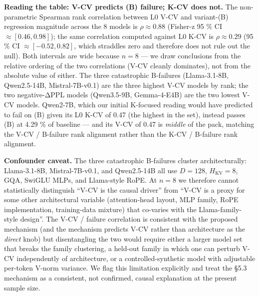 \textbf{Reading the table: V-CV predicts (B) failure; K-CV does not.}
The non-parametric Spearman rank correlation between L0 V-CV and
variant-(B) regression magnitude across the 8 models is
\(\rho \approx 0.88\) (Fisher-z 95 \% CI \(\approx [0.46, 0.98]\)); the
same correlation computed against L0 K-CV is \(\rho \approx 0.29\) (95
\% CI \(\approx [-0.52, 0.82]\), which straddles zero and therefore does
not rule out the null). Both intervals are wide because \(n = 8\) --- we
draw conclusions from the relative ordering of the two correlations
(V-CV cleanly dominates), not from the absolute value of either. The
three catastrophic B-failures (Llama-3.1-8B, Qwen2.5-14B,
Mistral-7B-v0.1) are the three highest V-CV models by rank; the two
negative-ΔPPL models (Qwen3.5-9B, Gemma-4-E4B) are the two lowest V-CV
models. Qwen2-7B, which our initial K-focused reading would have
predicted to fail on (B) given its L0 K-CV of 0.47 (the highest in the
set), instead passes (B) at 4.29 \% of baseline --- and its V-CV of 0.47
is \emph{middle} of the pack, matching the V-CV / B-failure rank
alignment rather than the K-CV / B-failure rank alignment.

\textbf{Confounder caveat.} The three catastrophic B-failures cluster
architecturally: Llama-3.1-8B, Mistral-7B-v0.1, and Qwen2.5-14B all use
\(D = 128\), \(H_{\mathrm{KV}} = 8\), GQA, SwiGLU MLPs, and Llama-style
RoPE. At \(n = 8\) we therefore cannot statistically distinguish ``V-CV
is the causal driver'' from ``V-CV is a proxy for some other
architectural variable (attention-head layout, MLP family, RoPE
implementation, training-data mixture) that co-varies with the
Llama-family-style design''. The V-CV / failure correlation is
consistent with the proposed mechanism (and the mechanism predicts V-CV
rather than architecture as the \emph{direct} knob) but disentangling
the two would require either a larger model set that breaks the family
clustering, a held-out family in which one can perturb V-CV
independently of architecture, or a controlled-synthetic model with
adjustable per-token V-norm variance. We flag this limitation explicitly
and treat the §5.3 mechanism as a consistent, not confirmed, causal
explanation at the present sample size.

